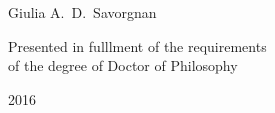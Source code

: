 \begin{titlepage}
\normalsize 
\vspace{0.5cm}
\begin{center}
\Large{Giulia A.~D.~Savorgnan}
\end{center}
\vspace{2cm}
\begin{center}
Presented in fulllment of the requirements   \\
of the degree of Doctor of Philosophy \\
\end{center}
\vspace{0.6cm}
\begin{center}
{\rule[-0.0cm]{0.0cm}{0.0cm} 2016}\\
\end{center}
\Large
\linespread{1.5}
\end{titlepage}

